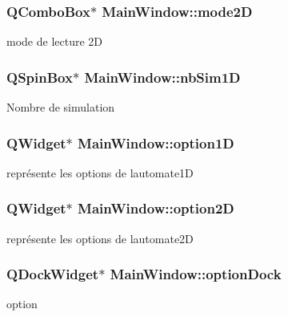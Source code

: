 \subsubsection[{\texorpdfstring{mode2D}{mode2D}}]{\setlength{\rightskip}{0pt plus 5cm}Q\+Combo\+Box$\ast$ Main\+Window\+::mode2D\hspace{0.3cm}{\ttfamily [private]}}\hypertarget{class_main_window_aaba4f5a028019a18aae76c21d3ffa0d5}{}\label{class_main_window_aaba4f5a028019a18aae76c21d3ffa0d5}
mode de lecture 2D 
\subsubsection[{\texorpdfstring{nb\+Sim1D}{nbSim1D}}]{\setlength{\rightskip}{0pt plus 5cm}Q\+Spin\+Box$\ast$ Main\+Window\+::nb\+Sim1D\hspace{0.3cm}{\ttfamily [private]}}\hypertarget{class_main_window_adf5c1f107d4ba21b762ddde7c9284f57}{}\label{class_main_window_adf5c1f107d4ba21b762ddde7c9284f57}
Nombre de simulation 
\subsubsection[{\texorpdfstring{option1D}{option1D}}]{\setlength{\rightskip}{0pt plus 5cm}Q\+Widget$\ast$ Main\+Window\+::option1D\hspace{0.3cm}{\ttfamily [private]}}\hypertarget{class_main_window_a676e5f857b1b37f685cce4d1b53e221c}{}\label{class_main_window_a676e5f857b1b37f685cce4d1b53e221c}
représente les options de l\textquotesingle{}automate1D 
\subsubsection[{\texorpdfstring{option2D}{option2D}}]{\setlength{\rightskip}{0pt plus 5cm}Q\+Widget$\ast$ Main\+Window\+::option2D\hspace{0.3cm}{\ttfamily [private]}}\hypertarget{class_main_window_abe71dc980ca6f6a52d5d0f9bf0902dff}{}\label{class_main_window_abe71dc980ca6f6a52d5d0f9bf0902dff}
représente les options de l\textquotesingle{}automate2D 
\subsubsection[{\texorpdfstring{option\+Dock}{optionDock}}]{\setlength{\rightskip}{0pt plus 5cm}Q\+Dock\+Widget$\ast$ Main\+Window\+::option\+Dock\hspace{0.3cm}{\ttfamily [private]}}\hypertarget{class_main_window_a2cfa6cfbdcaba78e37d9dd17847dd620}{}\label{class_main_window_a2cfa6cfbdcaba78e37d9dd17847dd620}
option 
